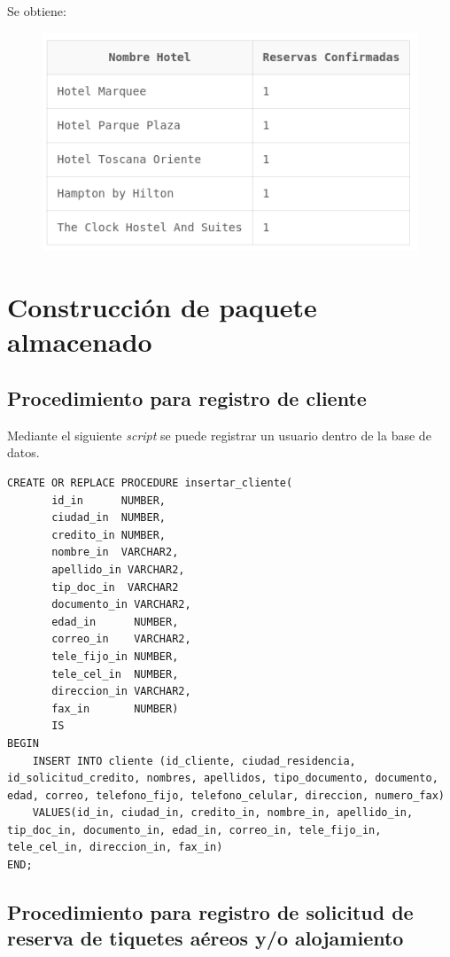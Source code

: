 \documentclass{article}
\begin{document}
Se obtiene:

\begin{figure}[h]
    \centering
    \includegraphics[width=0.75\linewidth]{img/Consulta_7.png}
\end{figure}

\newpage
\section{Construcción de paquete almacenado}

\subsection{Procedimiento para registro de cliente}
Mediante el siguiente \textit{script} se puede registrar un usuario dentro de la base de datos.
\begin{lstlisting}
CREATE OR REPLACE PROCEDURE insertar_cliente(
       id_in	  NUMBER,
       ciudad_in  NUMBER,
       credito_in NUMBER,
       nombre_in  VARCHAR2,
       apellido_in VARCHAR2,
       tip_doc_in  VARCHAR2
       documento_in VARCHAR2,
       edad_in	    NUMBER,
       correo_in    VARCHAR2,
       tele_fijo_in NUMBER,
       tele_cel_in  NUMBER,
       direccion_in VARCHAR2,
       fax_in	    NUMBER)
       IS
BEGIN
	INSERT INTO cliente (id_cliente, ciudad_residencia, id_solicitud_credito, nombres, apellidos, tipo_documento, documento, edad, correo, telefono_fijo, telefono_celular, direccion, numero_fax)
	VALUES(id_in, ciudad_in, credito_in, nombre_in, apellido_in, tip_doc_in, documento_in, edad_in, correo_in, tele_fijo_in, tele_cel_in, direccion_in, fax_in)
END;
\end{lstlisting}
\subsection{Procedimiento para registro de solicitud de reserva de tiquetes aéreos y/o alojamiento}
\end{document}
